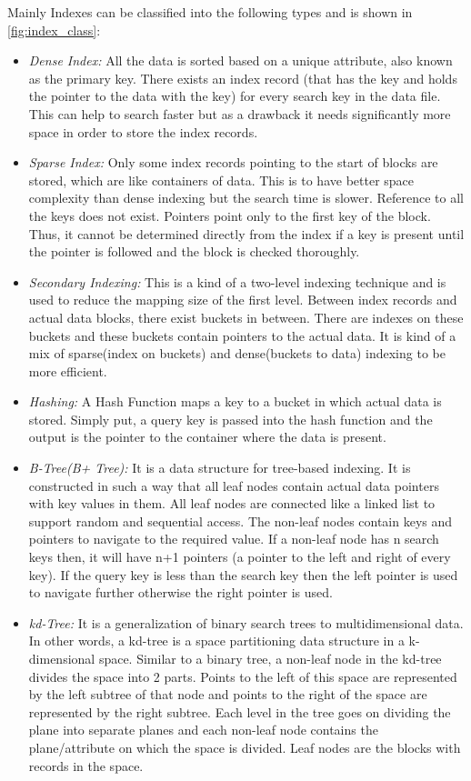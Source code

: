 Mainly Indexes can be classified into the following types \cite{garcia2008database} and is shown in \ref{fig:index_class}:
\begin{itemize}
    \item \textit{Dense Index:} All the data is sorted based on a unique attribute, also known as the primary key. There exists an index record (that has the key and holds the pointer to the data with the key) for every search key in the data file. This can help to search faster but as a drawback it
needs significantly more space in order to store the index records.
    \item \textit{Sparse Index:} Only some index records pointing to the start of blocks are stored, which are like containers of data. This is to have better space complexity than dense indexing but the search time is slower. Reference to all the keys does not exist. Pointers point 
only to the first key of the block. Thus, it cannot be determined directly from the index if a key is present until the pointer is followed and the block is checked thoroughly.
    \item \textit{Secondary Indexing:} This is a kind of a two-level indexing technique and is used to reduce the mapping size of the first level. Between index 
records and actual data blocks, there exist buckets in between. 
There are indexes on these buckets and these buckets contain pointers to the actual data.
It is kind of a mix of sparse(index on buckets) and dense(buckets to data) indexing to be more efficient.
    \item \textit{Hashing:} A Hash Function maps a key to a bucket in which actual data is stored. Simply put, a query key is passed into the hash function and the output is the pointer to the container where the data is present.
    \item \textit{B-Tree(B+ Tree):} It is a data structure for tree-based indexing. It is constructed in such a way that all leaf nodes contain actual data pointers with 
    key values in them. 
    All leaf nodes are connected like a linked list to support random and sequential access. 
    The non-leaf nodes contain keys and pointers to navigate to the required value. 
    If a non-leaf node has n search keys then, it will have n+1 pointers (a pointer 
    to the left and right of every key). If the query key is less than the search key then the left pointer is used to navigate further otherwise the right pointer is used.
    \item \textit{kd-Tree:} It is a generalization of binary search trees to multidimensional data. 
    In other words, a kd-tree is a space partitioning data structure in a k-dimensional space.
    Similar to a binary tree, a non-leaf node in the kd-tree divides the space into 2 parts.
    Points to the left of this space are represented by the left subtree of that 
    node and points to the right of the space are represented by the right subtree. 
    Each level in the tree goes on dividing the plane into 
    separate planes and each non-leaf node contains the plane/attribute on which the space is divided. 
    Leaf nodes are the blocks with records in the space.
\end{itemize}

